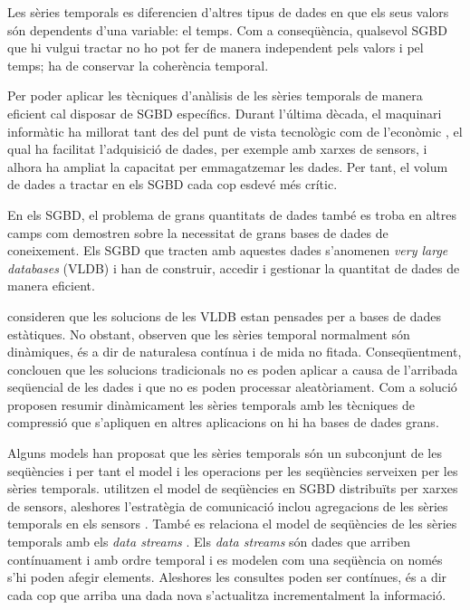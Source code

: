 Les sèries temporals es diferencien d'altres tipus de dades en que els seus valors són dependents d'una variable: el temps. Com a conseqüència, qualsevol SGBD que hi vulgui tractar no ho pot fer de manera independent pels valors i pel temps; ha de conservar la coherència temporal.

Per poder aplicar les tècniques d'anàlisis de les sèries temporals de manera eficient cal disposar de SGBD específics. 
Durant l'última dècada, el maquinari informàtic ha millorat tant des del punt de vista tecnològic com de l'econòmic \parencite{deligiannakis07}, el qual ha facilitat l'adquisició de dades, per exemple amb xarxes de sensors, i alhora ha ampliat la capacitat per emmagatzemar les dades. 
Per tant, el volum de dades a tractar  en els SGBD cada cop esdevé més crític.

 
En els SGBD, el problema de grans quantitats de dades també es troba en altres camps com demostren \textcite{mylopoulos96} sobre la necessitat de grans bases de dades de coneixement. Els SGBD que tracten amb aquestes dades s'anomenen \emph{very large databases} (VLDB) i han de construir, accedir i gestionar la quantitat de dades de manera eficient.

\textcite{ogras06}  consideren que les solucions de les VLDB estan pensades per a bases de dades estàtiques. No obstant, observen que les sèries temporal normalment són dinàmiques, és a dir de naturalesa contínua i de mida no fitada. Conseqüentment, conclouen que les solucions tradicionals no es poden aplicar a causa de l'arribada seqüencial de les dades i que no es poden processar aleatòriament. 
Com a solució proposen resumir dinàmicament les sèries temporals amb les tècniques de compressió que s'apliquen en altres aplicacions on hi ha bases de dades grans.


Alguns models han proposat que les sèries temporals són un subconjunt de les seqüències \parencite{seshadri96:thesis} i per tant el model i les operacions per les seqüències \parencite{seshadri95} serveixen per les sèries temporals. 
\textcite{bonnet01} utilitzen el model de seqüències en SGBD distribuïts per xarxes de sensors, aleshores l'estratègia de comunicació inclou agregacions de les sèries temporals en els sensors \parencite{demers03}.
També es relaciona el model de seqüències de les sèries temporals amb els \emph{data streams} \parencite{babcock02}. Els \emph{data streams} són dades que arriben contínuament i amb ordre temporal i es modelen com una seqüència on només s'hi poden afegir elements. Aleshores les consultes poden ser contínues, és a dir cada cop que arriba una dada nova s'actualitza incrementalment la informació. 


